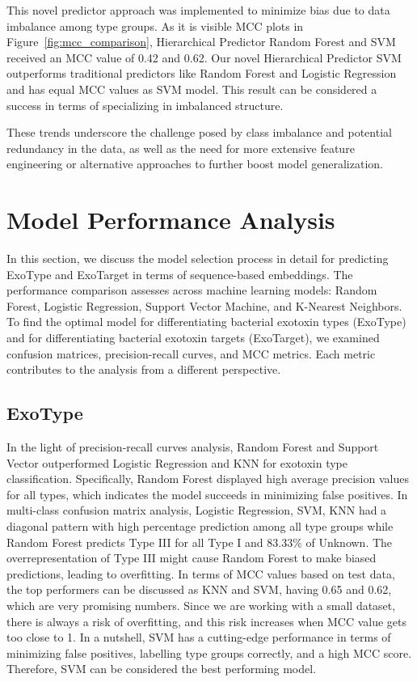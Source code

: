 This novel predictor approach was implemented to minimize bias due to data imbalance among type groups. As it is visible \gls{MCC} plots in Figure~\ref{fig:mcc_comparison}, Hierarchical Predictor Random Forest and \gls{SVM} received an \gls{MCC} value of 0.42 and 0.62. Our novel Hierarchical Predictor \gls{SVM} outperforms traditional predictors like Random Forest and Logistic Regression and has equal \gls{MCC} values as \gls{SVM} model. This result can be considered a success in terms of specializing in imbalanced structure.

These trends underscore the challenge posed by class imbalance and potential redundancy in the data, as well as the need for more extensive feature engineering or alternative approaches to further boost model generalization.



\section{Model Performance Analysis}
In this section, we discuss the model selection process in detail for predicting ExoType and ExoTarget in terms of sequence-based embeddings. The performance comparison assesses across machine learning models: Random Forest, Logistic Regression, Support Vector Machine, and K-Nearest Neighbors.
To find the optimal model for differentiating bacterial exotoxin types (ExoType) and for differentiating bacterial exotoxin targets (ExoTarget), we examined confusion matrices, precision-recall curves, and \gls{MCC} metrics. 
Each metric contributes to the analysis from a different perspective. 

\subsection{ExoType}
In the light of precision-recall curves analysis, Random Forest and Support Vector outperformed Logistic Regression and \gls{KNN} for exotoxin type classification. Specifically, Random Forest displayed high average precision values for all types, which indicates the model succeeds in minimizing false positives.
In multi-class confusion matrix analysis, Logistic Regression, \gls{SVM}, \gls{KNN} had a diagonal pattern with high percentage prediction among all type groups while Random Forest predicts Type III for all Type I and  83.33\% of Unknown. The overrepresentation of Type III might cause Random Forest to make biased predictions, leading to overfitting. 
In terms of \gls{MCC} values based on test data, the top performers can be discussed as \gls{KNN} and \gls{SVM}, having 0.65 and 0.62, which are very promising numbers. Since we are working with a small dataset, there is always a risk of overfitting, and this risk increases when \gls{MCC} value gets too close to 1.
In a nutshell, \gls{SVM} has a cutting-edge performance in terms of minimizing false positives, labelling type groups correctly, and a high \gls{MCC} score. Therefore, \gls{SVM} can be considered the best performing model.

